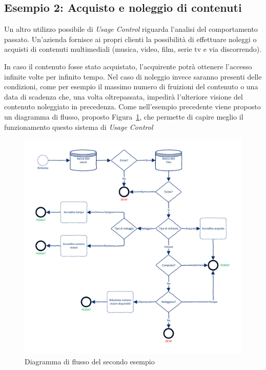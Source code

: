 \subsection*{Esempio 2: Acquisto e noleggio di contenuti}
Un altro utilizzo possibile di \textit{Usage Control} riguarda l'analisi del comportamento passato. Un'azienda fornisce  ai propri clienti 
la possibilità di effettuare noleggi o acquisti di contenuti multimediali (musica, video, film, serie tv e via discorrendo).\\ \par
In caso il contenuto fosse stato acquistato, l’acquirente potrà ottenere
l’accesso infinite volte per infinito tempo. Nel caso di noleggio invece
saranno presenti delle condizioni, come per esempio il massimo numero
di fruizioni del contenuto o una data di scadenza che, una volta oltrepassata,
impedirà l’ulteriore visione del contenuto noleggiato in precedenza.
Come nell’esempio precedente viene proposto un diagramma di flusso,
proposto Figura~\ref{fig:diagrammaflussosecondoesempio}, che permette di capire meglio il funzionamento questo sistema di \textit{Usage Control}
\begin{figure}[H]
 \centering 
	\includegraphics[scale = 0.75]{./Visio_Project/DiagrammaFlussoSecondoEsempio.pdf}
 \caption{Diagramma di flusso del secondo esempio}
 \label{fig:diagrammaflussosecondoesempio}
\end{figure}
